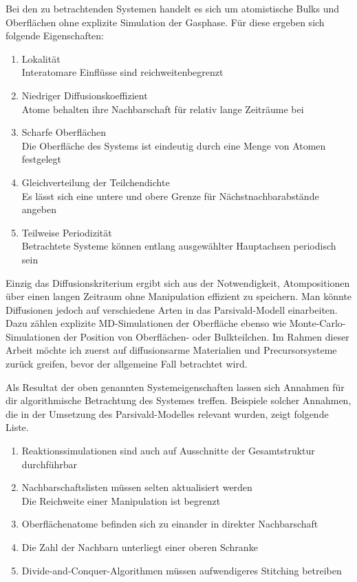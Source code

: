 Bei den zu betrachtenden Systemen handelt es sich um atomistische Bulks und Oberflächen ohne explizite Simulation der Gasphase.
Für diese ergeben sich folgende Eigenschaften:
\begin{enumerate}
\item Lokalität\\
  Interatomare Einflüsse sind reichweitenbegrenzt
\item Niedriger Diffusionskoeffizient\\
  Atome behalten ihre Nachbarschaft für relativ lange Zeiträume bei
\item Scharfe Oberflächen\\
  Die Oberfläche des Systems ist eindeutig durch eine Menge von Atomen festgelegt
\item Gleichverteilung der Teilchendichte\\
  Es lässt sich eine untere und obere Grenze für Nächstnachbarabstände angeben
\item Teilweise Periodizität\\
  Betrachtete Systeme können entlang ausgewählter Hauptachsen periodisch sein
\end{enumerate}

Einzig das Diffusionskriterium ergibt sich aus der Notwendigkeit, Atompositionen über einen langen Zeitraum ohne Manipulation effizient zu speichern.
Man könnte Diffusionen jedoch auf verschiedene Arten in das Parsivald-Modell einarbeiten.
Dazu zählen explizite MD-Simulationen der Oberfläche ebenso wie Monte-Carlo-Simulationen der Position von Oberflächen- oder Bulkteilchen.
Im Rahmen dieser Arbeit möchte ich zuerst auf diffusionsarme Materialien und Precursorsysteme zurück greifen, bevor der allgemeine Fall betrachtet wird.

Als Resultat der oben genannten Systemeigenschaften lassen sich Annahmen für dir algorithmische Betrachtung des Systemes treffen.
Beispiele solcher Annahmen, die in der Umsetzung des Parsivald-Modelles relevant wurden, zeigt folgende Liste.

\begin{enumerate}
\item Reaktionssimulationen sind auch auf Ausschnitte der Gesamtstruktur durchführbar
\item Nachbarschaftslisten müssen selten aktualisiert werden\\
  Die Reichweite einer Manipulation ist begrenzt
\item Oberflächenatome befinden sich zu einander in direkter Nachbarschaft
\item Die Zahl der Nachbarn unterliegt einer oberen Schranke
\item Divide-and-Conquer-Algorithmen müssen aufwendigeres Stitching betreiben
\end{enumerate}

